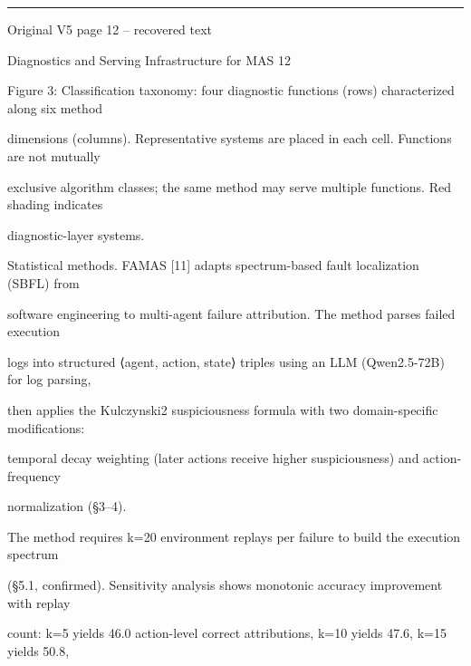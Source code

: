 \par\smallskip\noindent\rule{\textwidth}{0.4pt}\par{\sffamily\footnotesize Original V5 page 12 -- recovered text}\par\begin{flushleft}\footnotesize\ttfamily
\par\smallskip
\par\smallskip
\noindent Diagnostics and Serving Infrastructure for MAS 12\par
\par\smallskip
\par\smallskip
\par\smallskip
\par\smallskip
\noindent Figure 3: Classification taxonomy: four diagnostic functions (rows) characterized along six method\par
\noindent dimensions (columns). Representative systems are placed in each cell. Functions are not mutually\par
\noindent exclusive algorithm classes; the same method may serve multiple functions. Red shading indicates\par
\noindent diagnostic-layer systems.\par
\par\smallskip
\par\smallskip
\noindent Statistical methods. FAMAS [11] adapts spectrum-based fault localization (SBFL) from\par
\noindent software engineering to multi-agent failure attribution. The method parses failed execution\par
\noindent logs into structured ⟨agent, action, state⟩ triples using an LLM (Qwen2.5-72B) for log parsing,\par
\noindent then applies the Kulczynski2 suspiciousness formula with two domain-specific modifications:\par
\noindent temporal decay weighting (later actions receive higher suspiciousness) and action-frequency\par
\noindent normalization (§3–4).\par
\noindent  The method requires k=20 environment replays per failure to build the execution spectrum\par
\noindent (§5.1, confirmed). Sensitivity analysis shows monotonic accuracy improvement with replay\par
\noindent count: k=5 yields 46.0 action-level correct attributions, k=10 yields 47.6, k=15 yields 50.8,\par

\end{flushleft}

